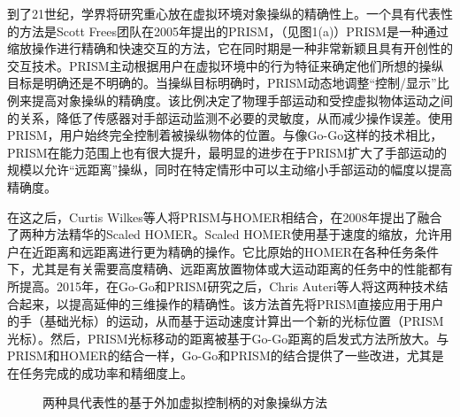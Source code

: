 到了21世纪，学界将研究重心放在虚拟环境对象操纵的精确性上。一个具有代表性的方法是Scott Frees团队在2005年提出的PRISM，（见图1(a)）PRISM是一种通过缩放操作进行精确和快速交互的方法，它在同时期是一种非常新颖且具有开创性的交互技术。PRISM主动根据用户在虚拟环境中的行为特征来确定他们所想的操纵目标是明确还是不明确的。当操纵目标明确时，PRISM动态地调整“控制/显示”比例来提高对象操纵的精确度。该比例决定了物理手部运动和受控虚拟物体运动之间的关系，降低了传感器对手部运动监测不必要的灵敏度，从而减少操作误差。使用PRISM，用户始终完全控制着被操纵物体的位置。与像Go-Go这样的技术相比，PRISM在能力范围上也有很大提升，最明显的进步在于PRISM扩大了手部运动的规模以允许“远距离”操纵，同时在特定情形中可以主动缩小手部运动的幅度以提高精确度。

在这之后，Curtis Wilkes等人将PRISM与HOMER相结合，在2008年提出了融合了两种方法精华的Scaled HOMER\cite{2008Curtis}。Scaled HOMER使用基于速度的缩放，允许用户在近距离和远距离进行更为精确的操作。它比原始的HOMER在各种任务条件下，尤其是有关需要高度精确、远距离放置物体或大运动距离的任务中的性能都有所提高。2015年，在Go-Go和PRISM研究之后，Chris Auteri等人将这两种技术结合起来，以提高延伸的三维操作的精确性。该方法首先将PRISM直接应用于用户的手（基础光标）的运动，从而基于运动速度计算出一个新的光标位置（PRISM光标）。然后，PRISM光标移动的距离被基于Go-Go距离的启发式方法所放大。与 PRISM和HOMER的结合一样，Go-Go和PRISM的结合提供了一些改进，尤其是在任务完成的成功率和精细度上。

\begin{figure}[t!]
    \centering
    \hspace{5em} %
    \caption{两种具代表性的基于外加虚拟控制柄的对象操纵方法}
    \label{fig-3}
\end{figure}

